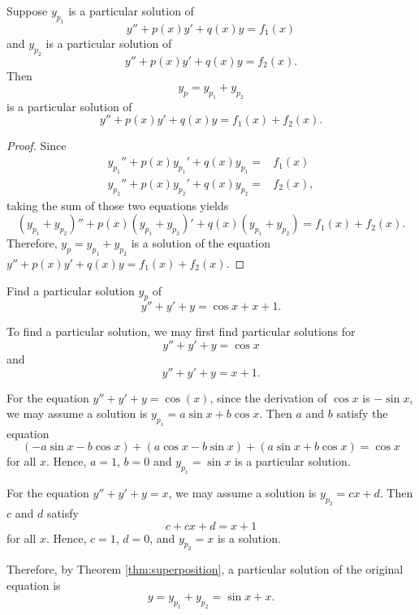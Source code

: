 \begin{theorem}\label{thm:superposition}
  Suppose \(y_{p_1}\) is a particular solution of
\[y''+p(x)y'+q(x)y=f_1(x)\]
and \(y_{p_2}\) is a particular solution of
\[y''+p(x)y'+q(x)y=f_2(x).\] 
Then
\[y_p=y_{p_1}+y_{p_2}\]
is a particular solution of
\[y''+p(x)y'+q(x)y=f_1(x)+f_2(x).\]
\end{theorem}
\begin{proof}
  Since 
  \[
  \begin{aligned}
    y_{p_1}''+p(x)y_{p_1}'+q(x)y_{p_1}=&f_1(x)\\
    y_{p_2}''+p(x)y_{p_2}'+q(x)y_{p_2}=&f_2(x),
  \end{aligned}  
  \]
  taking the sum of those two equations yields
  \[
    (y_{p_1}+y_{p_2})''+p(x)(y_{p_1}+y_{p_2})'+q(x)(y_{p_1}+y_{p_2})=f_1(x)+f_2(x).
  \]
  Therefore, $y_p=y_{p_1}+y_{p_2}$ is a solution of the equation $y''+p(x)y'+q(x)y=f_1(x)+f_2(x)$.
\end{proof}


\begin{example}
  Find a particular solution $y_p$ of 
\[y'' + y' +  y = \cos x + x + 1.\]
\end{example}
\begin{solution}
  To find a particular solution, we may first find particular solutions for
  \[y'' + y' +  y = \cos x\]
  and
  \[y'' + y' +  y = x+1.\]

  For the equation $y'' + y' +  y = \cos(x)$, since the derivation of $\cos x$ is $-\sin x$, we may assume a solution is $y_{p_1}=a\sin x +b\cos x$. Then $a$ and $b$ satisfy the equation
  \[(-a\sin x-b\cos x)+(a\cos x-b\sin x)+ (a\sin x+b\cos x)=\cos x\]
  for all $x$.
  Hence, $a=1$, $b=0$ and $y_{p_1}=\sin x$ is a particular solution.

  For the equation $y'' + y' + y=x$, we may assume a solution is $y_{p_2}=cx+d$. Then $c$ and $d$ satisfy
  \[c+cx+d=x+1\]
  for all $x$.
  Hence, $c=1$, $d=0$, and $y_{p_2}=x$ is a solution.

  Therefore, by Theorem \ref{thm:superposition}, a particular solution of the original equation is
  \[y=y_{p_1}+y_{p_2}=\sin x + x.\]
\end{solution}

